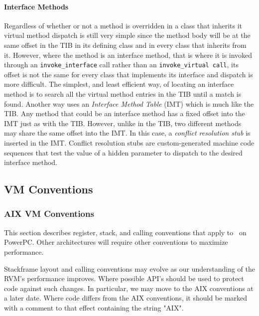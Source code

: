 \paragraph{Interface Methods}
Regardless of whether or not a method is overridden in a class that inherits it
virtual method dispatch is still very simple since the method body will be at
the same offset in the TIB in its defining class and in every class that 
inherits from it. 
However, where the method is an interface method, 
that is where it is invoked through an {\tt invoke\_interface} call rather than
an {\tt invoke\_virtual call}, its offset is not the same for every class that 
implements its interface and dispatch is more difficult.
The simplest, and least efficient way, of locating an interface method 
is to search all the virtual method entries in the TIB until a match is found.
Another way uses an {\em Interface Method Table} (IMT) which is much like the 
TIB. Any method that could be an interface method has a fixed offset into the 
IMT just as with the TIB. However, unlike in the TIB, two different methods may
share the same offset into the IMT. In this case, a {\em conflict resolution
stub} is inserted in the IMT. Conflict resolution stubs are
custom-generated machine code sequences that test the value of a
hidden parameter to dispatch to the desired interface method.


\subsection{VM Conventions}
\subsubsection{AIX VM Conventions} \label{aix-conventions}

This section describes register, stack, and calling conventions that apply to 
\jp\ on PowerPC.
Other architectures will require other conventions to maximize performance.

Stackframe layout and calling conventions may evolve as our understanding
of the RVM's performance improves.  Where possible API's should be used
to protect code against such changes.  In particular, we may move to
the AIX conventions at a later date.  Where code differs from the AIX
conventions, it should be marked with a comment to that effect containing
the string "AIX".

